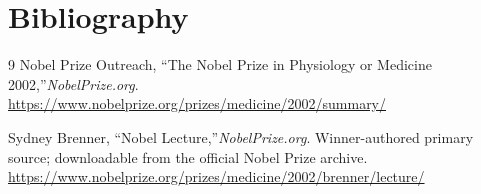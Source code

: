 \section{Bibliography}

\begin{thebibliography}{9}
Nobel Prize Outreach, ``The Nobel Prize in Physiology or Medicine 2002,''\emph{NobelPrize.org}.\\
\url{https://www.nobelprize.org/prizes/medicine/2002/summary/}

Sydney Brenner, ``Nobel Lecture,''\emph{NobelPrize.org}. Winner-authored primary source; downloadable from the official Nobel Prize archive.\\
\url{https://www.nobelprize.org/prizes/medicine/2002/brenner/lecture/}
\end{thebibliography}
